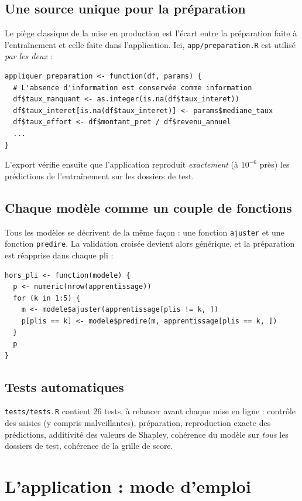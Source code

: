 \documentclass[11pt,a4paper]{article}
\newcommand{\code}[1]{\texttt{#1}}
\begin{document}
\subsection{Une source unique pour la préparation}
Le piège classique de la mise en production est l'écart entre la préparation faite à l'entraînement et celle faite dans l'application. Ici, \code{app/preparation.R} est utilisé \emph{par les deux} :
\begin{lstlisting}
appliquer_preparation <- function(df, params) {
  # L'absence d'information est conservée comme information
  df$taux_manquant <- as.integer(is.na(df$taux_interet))
  df$taux_interet[is.na(df$taux_interet)] <- params$mediane_taux
  df$taux_effort <- df$montant_pret / df$revenu_annuel
  ...
}
\end{lstlisting}
L'export vérifie ensuite que l'application reproduit \emph{exactement} (à $10^{-6}$ près) les prédictions de l'entraînement sur les \nTest{} dossiers de test.

\subsection{Chaque modèle comme un couple de fonctions}
Tous les modèles se décrivent de la même façon : une fonction \code{ajuster} et une fonction \code{predire}. La validation croisée devient alors générique, et la préparation est réapprise dans chaque pli :
\begin{lstlisting}
hors_pli <- function(modele) {
  p <- numeric(nrow(apprentissage))
  for (k in 1:5) {
    m <- modele$ajuster(apprentissage[plis != k, ])
    p[plis == k] <- modele$predire(m, apprentissage[plis == k, ])
  }
  p
}
\end{lstlisting}

\subsection{Tests automatiques}
\code{tests/tests.R} contient 26 tests, à relancer avant chaque mise en ligne : contrôle des saisies (y compris malveillantes), préparation, reproduction exacte des prédictions, additivité des valeurs de Shapley, cohérence du modèle sur \emph{tous} les dossiers de test, cohérence de la grille de score.

\section{L'application : mode d'emploi}
\end{document}
